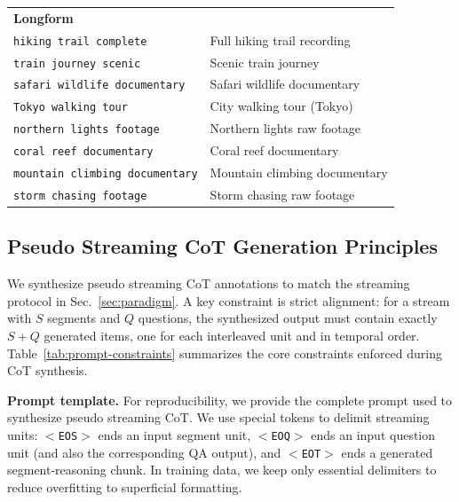 \documentclass{article}
\begin{document}
\begin{table}[t]
\begin{tabular}{p{}p{}}
    \multicolumn{2}{l}{\textbf{Longform}} \\
    \texttt{hiking trail complete} & Full hiking trail recording \\
    \texttt{train journey scenic} & Scenic train journey \\
    \texttt{safari wildlife documentary} & Safari wildlife documentary \\
    \texttt{Tokyo walking tour} & City walking tour (Tokyo) \\
    \texttt{northern lights footage} & Northern lights raw footage \\
    \texttt{coral reef documentary} & Coral reef documentary \\
    \texttt{mountain climbing documentary} & Mountain climbing documentary \\
    \texttt{storm chasing footage} & Storm chasing raw footage \\
    \bottomrule
  \end{tabular}
\end{table}

\subsection{Pseudo Streaming CoT Generation Principles}
\label{app:synthesis-principles}

We synthesize pseudo streaming CoT annotations to match the streaming protocol in Sec.~\ref{sec:paradigm}. A key constraint is strict alignment: for a stream with $S$ segments and $Q$ questions, the synthesized output must contain exactly $S+Q$ generated items, one for each interleaved unit and in temporal order. Table~\ref{tab:prompt-constraints} summarizes the core constraints enforced during CoT synthesis.

\noindent\textbf{Prompt template.}
For reproducibility, we provide the complete prompt used to synthesize pseudo streaming CoT. We use special tokens to delimit streaming units: \texttt{$<$EOS$>$} ends an input segment unit, \texttt{$<$EOQ$>$} ends an input question unit (and also the corresponding QA output), and \texttt{$<$EOT$>$} ends a generated segment-reasoning chunk. In training data, we keep only essential delimiters to reduce overfitting to superficial formatting.
\end{document}
